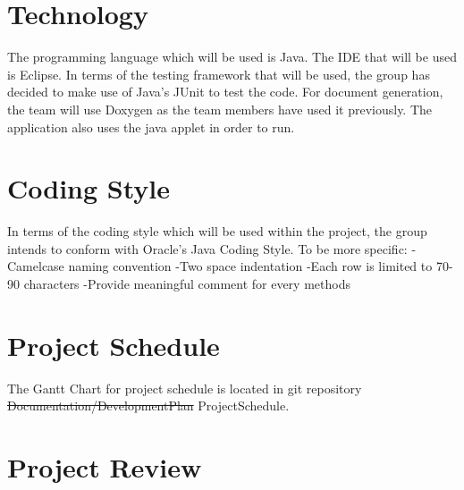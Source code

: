 \documentclass{article}
\newcommand{\rev}[1]{\textcolor{RevisionColour}{#1}}
\begin{document}
\section{Technology}

The programming language which will be used is Java. The IDE that will be used is Eclipse. In terms of the testing framework that will be used, the group has decided to make use of Java's JUnit to test the code. For document generation, the team will use Doxygen as the team members have used it previously.\rev{ The application also uses the java applet in order to run.}

\section{Coding Style}
In terms of the coding style which will be used within the project, the group intends to conform with Oracle's Java Coding Style.
To be more specific:
-Camelcase naming convention
-Two space indentation
-Each row is limited to 70-90 characters
-Provide meaningful comment for every methods
\citep{Oracle}


\section{Project Schedule}%
The Gantt Chart for project schedule is located in git repository \sout{Documentation/DevelopmentPlan} \rev{ProjectSchedule}.
\section{Project Review}



\end{document}

